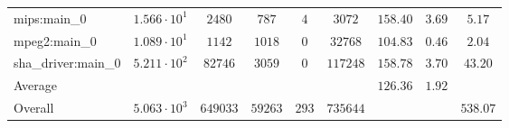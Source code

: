 \begin{tabular}{|l|c|c|c|c|c|c|c|c|}
mips:main\_0            & $ 1.566 \cdot 10^{1}  $ & $ 2480   $ & $ 787   $ & $ 4   $ & $ 3072   $ & $ 158.40      $ & $ 3.69    $ & $ 5.17    $ \\
mpeg2:main\_0           & $ 1.089 \cdot 10^{1}  $ & $ 1142   $ & $ 1018  $ & $ 0   $ & $ 32768  $ & $ 104.83      $ & $ 0.46    $ & $ 2.04    $ \\
sha\_driver:main\_0     & $ 5.211 \cdot 10^{2}  $ & $ 82746  $ & $ 3059  $ & $ 0   $ & $ 117248 $ & $ 158.78      $ & $ 3.70    $ & $ 43.20   $ \\
\hline
Average                 & $                     $ & $        $ & $       $ & $     $ & $        $ & $ 126.36      $ & $ 1.92    $ & $         $ \\
\hline
Overall                 & $ 5.063 \cdot 10^{3}  $ & $ 649033 $ & $ 59263 $ & $ 293 $ & $ 735644 $ & $             $ & $         $ & $ 538.07  $ \\
\hline
\end{tabular}
